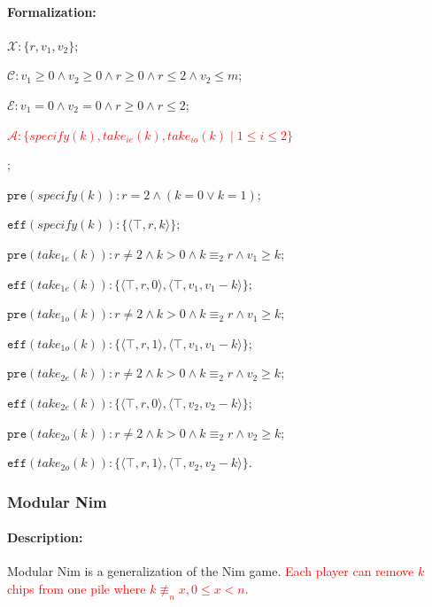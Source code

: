 \documentclass[review]{elsarticle}
\newcommand{\set}[1]{\{ #1 \}}
\newcommand{\tuple}[1]{\langle {#1} \rangle}
\newcommand{\true}{\top}
\newcommand{\statevar}{\mathcal{X}}
\newcommand{\act}{\mathcal{A}}
\newcommand{\constraint}{\mathcal{C}}
\newcommand{\estate}{\mathcal{E}}
\newcommand{\pre}{\mathtt{pre}}
\newcommand{\eff}{\mathtt{eff}}
\newcommand{\modulo}{\equiv}
\newcommand{\nmodulo}{\not \equiv}
\begin{document}
\paragraph{Formalization:}

\begin{itemize}
	\item $\statevar:\set{r, v_1, v_2} $;
	\item $\constraint: v_1 \ge 0 \wedge v_2 \ge 0 \wedge r \ge 0 \wedge  r \le 2 \wedge v_2 \le m$;
	\item $\estate: v_1 = 0 \wedge v_2 = 0 \wedge r \ge 0 \wedge  r \le 2$;
	\textcolor{red}{\item $\act:\set{specify(k), take_{ie}(k),  take_{io}(k) {\mid} 1\le i \le 2 }$};
	\item $\pre(specify(k)): r = 2 \land (k = 0 \lor k = 1)$;
	\item $\eff(specify(k)): \set{\tuple{\true, r, k}}$;
	\item $\pre(take_{1e}(k)): r \neq 2 \wedge k > 0 \wedge  k \modulo_{2}{r} \land v_1 \ge k$;
	\item $\eff(take_{1e}(k)): \set{\tuple{\true, r, 0}, \tuple{\true, v_1, v_1-k}}$; 
	\item $\pre(take_{1o}(k)): r \neq 2 \wedge k > 0 \wedge  k \modulo_{2}{r} \wedge  v_1 \ge k$;
	\item $\eff(take_{1o}(k)): \set{\tuple{\true, r, 1}, \tuple{\true, v_1, v_1-k}}$;
	\item $\pre(take_{2e}(k)): r \neq 2 \wedge k > 0 \wedge  k \modulo_{2}{r} \land v_2 \ge k$;
	\item $\eff(take_{2e}(k)): \set{\tuple{\true, r, 0}, \tuple{\true, v_2, v_2-k}}$; 
	\item $\pre(take_{2o}(k)): r \neq 2 \wedge k > 0 \wedge  k \modulo_{2}{r} \wedge  v_2 \ge k$;
	\item $\eff(take_{2o}(k)): \set{\tuple{\true, r, 1}, \tuple{\true, v_2, v_2-k}}$.
\end{itemize}

\subsubsection{Modular Nim \protect\cite{GavS2004}}

\paragraph{Description:} 
Modular Nim is a generalization of the Nim game.
\textcolor{red}{Each player can remove $k$ chips from one pile where $k \nmodulo_{n} x,0 \le x < n$.}
\end{document}
